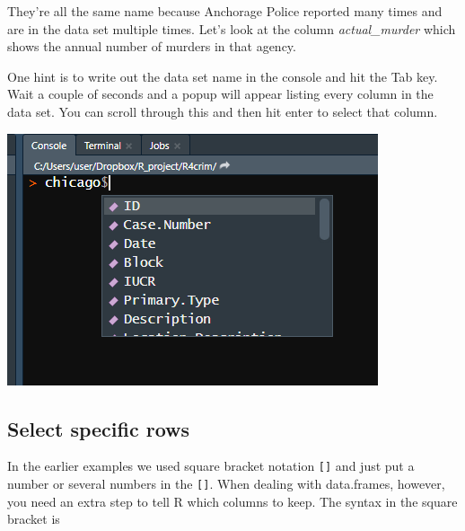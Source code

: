 \documentclass[
  12pt,
]{book}
\newenvironment{Shaded}{\begin{snugshade}}{\end{snugshade}}
\newcommand{\CommentTok}[1]{\textcolor[rgb]{0.37,0.37,0.37}{\textit{#1}}}
\newcommand{\DecValTok}[1]{\textcolor[rgb]{0.06,0.06,0.06}{#1}}
\newcommand{\KeywordTok}[1]{\textcolor[rgb]{0.27,0.27,0.27}{\textbf{#1}}}
\newcommand{\NormalTok}[1]{#1}
\newcommand{\OperatorTok}[1]{\textcolor[rgb]{0.43,0.43,0.43}{\textbf{#1}}}
\begin{document}
\begin{Shaded}
\end{Shaded}

They're all the same name because Anchorage Police reported many times and are in the data set multiple times. Let's look at the column \emph{actual\_murder} which shows the annual number of murders in that agency.

\begin{Shaded}
\end{Shaded}

One hint is to write out the data set name in the console and hit the Tab key. Wait a couple of seconds and a popup will appear listing every column in the data set. You can scroll through this and then hit enter to select that column.

\includegraphics{images/tab_example.png}

\hypertarget{select-specific-rows}{%
\subsection{Select specific rows}\label{select-specific-rows}}

In the earlier examples we used square bracket notation \texttt{{[}{]}} and just put a number or several numbers in the \texttt{{[}{]}}. When dealing with data.frames, however, you need an extra step to tell R which columns to keep. The syntax in the square bracket is
\end{document}
